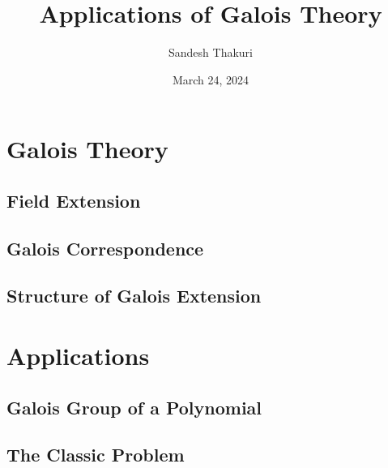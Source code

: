 \documentclass[a4paper,12pt,oneside,onecolumn,openany,final]{memoir}
\title{Applications of Galois Theory}
\author{Sandesh Thakuri}
\date{March 24, 2024}
\begin{document}
\frontmatter











\tableofcontents  %
\listoftables*
\listoffigures*

\mainmatter
\part{Galois Theory}

\chapter{Field Extension}


\chapter{Galois Correspondence}


\chapter{Structure of Galois Extension}


\part{Applications}

\chapter{Galois Group of a Polynomial}


\chapter{The Classic Problem}

\end{document}
